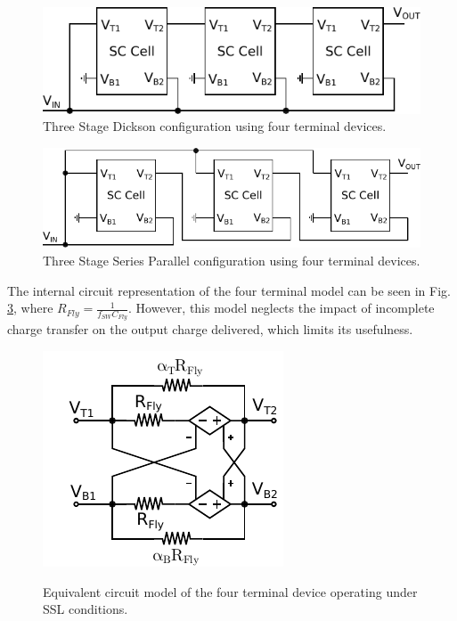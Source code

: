 \documentclass[conference]{IEEEtran}
\begin{document}
	\begin{figure}
		\includegraphics[width=\linewidth]{Figures/Dickson.pdf}
		\caption{Three Stage Dickson configuration using four terminal devices.}
		\label{Fig:Dickson_Block}
	\end{figure}

	\begin{figure}
		\includegraphics[width=\linewidth]{Figures/SeriesParallel.pdf}
		\caption{Three Stage Series Parallel configuration using four terminal devices.}
		\label{Fig:SeriesP_Block}
	\end{figure}
	
	The internal circuit representation of the four terminal model can be seen in Fig. \ref{Fig:CircEQ}, where $R_{Fly} = \frac{1}{f_{SW}C_{Fly}}$. However, this model neglects the impact of incomplete charge transfer on the output charge delivered, which limits its usefulness.
	
	\begin{figure}
		\centering
		\includegraphics[width=0.6\linewidth]{Figures/CellRes_SSL.pdf}
		\label{Fig:CircEQ}
		\caption{Equivalent circuit model of the four terminal device operating under SSL conditions.}
	\end{figure}
	
\end{document}
